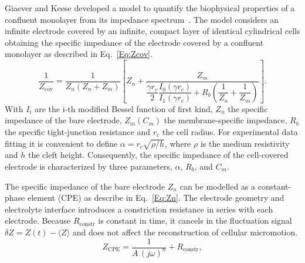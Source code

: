\documentclass[english, 10pt, a4paper]{article}
\begin{document}
Giaever and Keese developed a model to quantify the biophysical properties of a confluent monolayer from its impedance spectrum~\cite{giaever1991micromotion,giaever1984monitoring}. The model considers an infinite electrode covered by an infinite, compact layer of identical cylindrical cells obtaining the specific impedance of the electrode covered by a confluent monolayer as described in Eq.~\ref{Eq:Zcov}.
\begin{equation} \label{Eq:Zcov}
 \frac{1}{Z_\text{cov}} = \frac{1}{Z_n(Z_n+Z_m)}
 \left[Z_n + \frac{Z_m}{\dfrac{\gamma r_c}{2}
 \dfrac{I_0(\gamma r_c)}{I_1(\gamma r_c)}
 + R_b\!\left(\dfrac{1}{Z_n}+\dfrac{1}{Z_m}\right)}\right].
\end{equation}
With $I_i$ are the i-th modified Bessel function of first kind, $Z_n$ the specific impedance of the bare electrode, $Z_m(C_m)$ the membrane-specific impedance, $R_b$ the specific tight-junction resistance and $r_c$ the cell radius. For experimental data fitting it is convenient to define $\alpha = r_c\sqrt{\rho/h}$, where $\rho$ is the medium resistivity and $h$ the cleft height. Consequently, the specific impedance of the cell-covered electrode is characterized by three parameters, $\alpha$, $R_b$, and $C_m$.

The specific impedance of the bare electrode $Z_n$ can be modelled as a constant-phase element (CPE) as describe in Eq.~\ref{Eq:Zn}. The electrode geometry and electrolyte interface introduces a constriction resistance in series with each electrode. Because $R_\text{constr}$ is constant in time, it cancels in the fluctuation signal $\delta Z = Z(t) - \langle Z \rangle$ and does not affect the reconstruction of cellular micromotion.
\begin{equation} \label{Eq:Zn}
 Z_\text{CPE} = \frac{1}{A\,(j\omega)^n} + R_\text{constr},
\end{equation}
\end{document}
